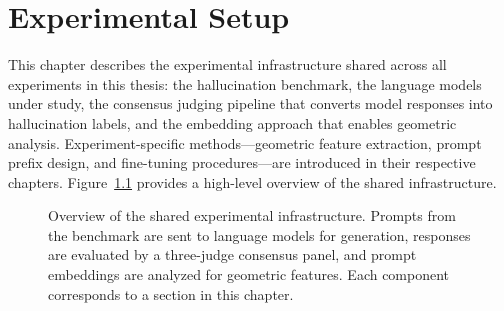
\chapter{Experimental Setup}
\label{ch:setup}

This chapter describes the experimental infrastructure shared across all experiments in this thesis: the hallucination benchmark, the language models under study, the consensus judging pipeline that converts model responses into hallucination labels, and the embedding approach that enables geometric analysis. Experiment-specific methods---geometric feature extraction, prompt prefix design, and fine-tuning procedures---are introduced in their respective chapters. Figure~\ref{fig:pipeline-overview} provides a high-level overview of the shared infrastructure.

\begin{figure}[ht]
\centering
{}
\caption{Overview of the shared experimental infrastructure. Prompts from the benchmark are sent to language models for generation, responses are evaluated by a three-judge consensus panel, and prompt embeddings are analyzed for geometric features. Each component corresponds to a section in this chapter.}
\label{fig:pipeline-overview}
\end{figure}

